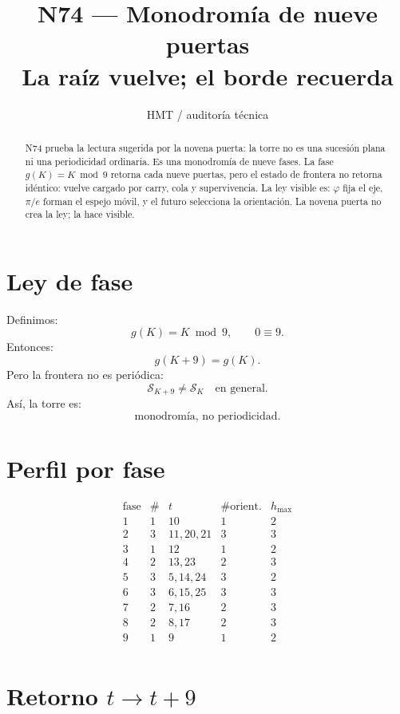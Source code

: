 \documentclass[11pt,a4paper]{article}
\title{\bfseries N74 --- Monodromía de nueve puertas\\
\large La raíz vuelve; el borde recuerda}
\author{HMT / auditoría técnica}
\date{}
\begin{document}
\maketitle

\begin{abstract}
N74 prueba la lectura sugerida por la novena puerta: la torre no es una sucesión plana ni una periodicidad ordinaria. Es una monodromía de nueve fases. La fase \(g(K)=K\bmod9\) retorna cada nueve puertas, pero el estado de frontera no retorna idéntico: vuelve cargado por carry, cola y supervivencia. La ley visible es: \(\varphi\) fija el eje, \(\pi/e\) forman el espejo móvil, y el futuro selecciona la orientación. La novena puerta no crea la ley; la hace visible.
\end{abstract}

\section{Ley de fase}

Definimos:
\[
g(K)=K\bmod9,\qquad 0\equiv9.
\]
Entonces:
\[
\boxed{
g(K+9)=g(K).
}
\]
Pero la frontera no es periódica:
\[
\boxed{
\mathcal S_{K+9}\neq \mathcal S_K\quad\text{en general}.
}
\]
Así, la torre es:
\[
\boxed{
\text{monodromía, no periodicidad.}
}
\]

\section{Perfil por fase}

\[
\begin{array}{c|c|c|c|c}
\text{fase}&\#&t&\#\text{orient.}&h_{\max}\\
\hline
1 & 1 & 10 & 1 & 2 \\
2 & 3 & 11,20,21 & 3 & 3 \\
3 & 1 & 12 & 1 & 2 \\
4 & 2 & 13,23 & 2 & 3 \\
5 & 3 & 5,14,24 & 3 & 2 \\
6 & 3 & 6,15,25 & 3 & 3 \\
7 & 2 & 7,16 & 2 & 3 \\
8 & 2 & 8,17 & 2 & 3 \\
9 & 1 & 9 & 1 & 2 \\
\end{array}
\]

\section{Retorno \(t\to t+9\)}
\end{document}
